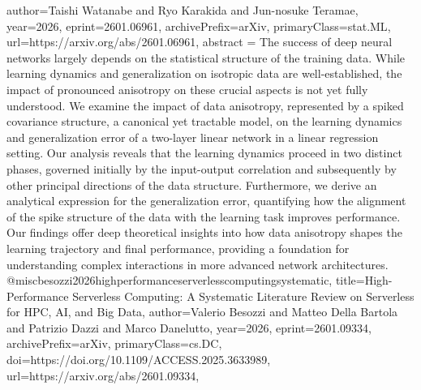 {      author={Taishi Watanabe and Ryo Karakida and Jun-nosuke Teramae},
      year={2026},
      eprint={2601.06961},
      archivePrefix={arXiv},
      primaryClass={stat.ML},
      url={https://arxiv.org/abs/2601.06961},
      abstract = {The success of deep neural networks largely depends on the statistical structure of the training data. While learning dynamics and generalization on isotropic data are well-established, the impact of pronounced anisotropy on these crucial aspects is not yet fully understood. We examine the impact of data anisotropy, represented by a spiked covariance structure, a canonical yet tractable model, on the learning dynamics and generalization error of a two-layer linear network in a linear regression setting. Our analysis reveals that the learning dynamics proceed in two distinct phases, governed initially by the input-output correlation and subsequently by other principal directions of the data structure. Furthermore, we derive an analytical expression for the generalization error, quantifying how the alignment of the spike structure of the data with the learning task improves performance. Our findings offer deep theoretical insights into how data anisotropy shapes the learning trajectory and final performance, providing a foundation for understanding complex interactions in more advanced network architectures.}
}@misc{besozzi2026highperformanceserverlesscomputingsystematic,
      title={High-Performance Serverless Computing: A Systematic Literature Review on Serverless for HPC, AI, and Big Data}, 
      author={Valerio Besozzi and Matteo Della Bartola and Patrizio Dazzi and Marco Danelutto},
      year={2026},
      eprint={2601.09334},
      archivePrefix={arXiv},
      primaryClass={cs.DC},
      doi={https://doi.org/10.1109/ACCESS.2025.3633989},
      url={https://arxiv.org/abs/2601.09334},
}
